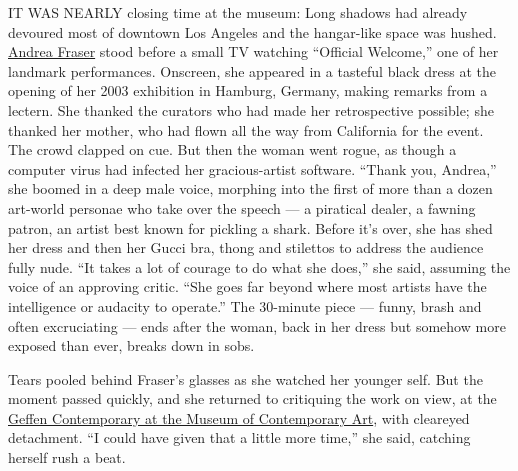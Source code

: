 IT WAS NEARLY closing time at the museum: Long shadows had already
devoured most of downtown Los Angeles and the hangar-like space was
hushed. \href{https://www.art.ucla.edu/faculty/fraser.html}{Andrea
Fraser} stood before a small TV watching ``Official Welcome,'' one of
her landmark performances. Onscreen, she appeared in a tasteful black
dress at the opening of her 2003 exhibition in Hamburg, Germany, making
remarks from a lectern. She thanked the curators who had made her
retrospective possible; she thanked her mother, who had flown all the
way from California for the event. The crowd clapped on cue. But then
the woman went rogue, as though a computer virus had infected her
gracious-artist software. ``Thank you, Andrea,'' she boomed in a deep
male voice, morphing into the first of more than a dozen art-world
personae who take over the speech --- a piratical dealer, a fawning
patron, an artist best known for pickling a shark. Before it's over, she
has shed her dress and then her Gucci bra, thong and stilettos to
address the audience fully nude. ``It takes a lot of courage to do what
she does,'' she said, assuming the voice of an approving critic. ``She
goes far beyond where most artists have the intelligence or audacity to
operate.'' The 30-minute piece --- funny, brash and often excruciating
--- ends after the woman, back in her dress but somehow more exposed
than ever, breaks down in sobs.

Tears pooled behind Fraser's glasses as she watched her younger self.
But the moment passed quickly, and she returned to critiquing the work
on view, at the
\href{https://www.moca.org/visit/geffen-contemporary}{Geffen
Contemporary at the Museum of Contemporary Art}, with cleareyed
detachment. ``I could have given that a little more time,'' she said,
catching herself rush a beat.

